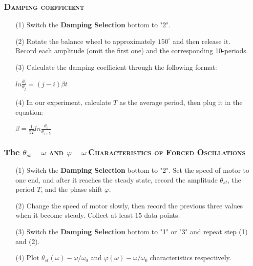 \documentclass[a4paper,12pt]{article}
\begin{document}
\subsubsection{\textsc{Damping coefficient}}
\begin{itemize}
\item[(1)] Switch the \textbf{Damping Selection} bottom to "2".
\item[(2)] Rotate the balance wheel to approximately $150^{\circ}$ and then release it. Record each amplitude (omit the first one) and the corresponding 10-periods.
\item[(3)] Calculate the damping coefficient through the following format:
\begin{center}
$\displaystyle ln\frac{\theta_i}{\theta_j} = (j-i) \beta t$
\end{center}
\item[(4)] In our experiment, calculate $T$ as the average period, then plug it in the equation:
\begin{center}
$\displaystyle \beta = \frac{1}{5T}ln\frac{\theta_i}{\theta_{i+5}}$
\end{center}
\end{itemize}
\subsubsection{The $\theta_{st}-\omega$ \textsc{and} $\varphi-\omega~$\textsc{Characteristics of Forced Oscillations}}
\begin{itemize}
\item[(1)] Switch the \textbf{Damping Selection} bottom to "2". Set the speed of motor to one end, and after it reaches the steady state, record the amplitude $\theta_{st}$, the period $T$, and the phase shift $\varphi$.
\item[(2)] Change the speed of motor slowly, then record the previous three values when it become steady. Collect at least 15 data points.
\item[(3)] Switch the \textbf{Damping Selection} bottom to "1" or "3" and repeat step (1) and (2).
\item[(4)] Plot $\displaystyle \theta_{st}(\omega) - \omega/\omega_0$ and $\displaystyle \varphi(\omega) - \omega/\omega_0$ characteristics respectively.
\end{itemize}
\end{document}

